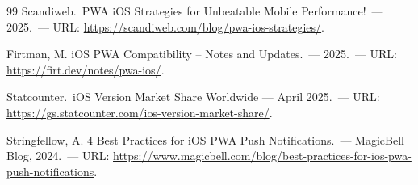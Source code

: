 \begin{thebibliography}{99}
     Scandiweb.\ PWA iOS Strategies for Unbeatable Mobile Performance!\ — 2025.\ — URL: \url{https://scandiweb.com/blog/pwa-ios-strategies/}.

     Firtman, M. iOS PWA Compatibility – Notes and Updates.\ — 2025.\ — URL: \url{https://firt.dev/notes/pwa-ios/}.

     Statcounter.\ iOS Version Market Share Worldwide — April 2025.\ — URL: \url{https://gs.statcounter.com/ios-version-market-share/}.

     Stringfellow, A. 4 Best Practices for iOS PWA Push Notifications.\ — MagicBell Blog, 2024.\ — URL: \url{https://www.magicbell.com/blog/best-practices-for-ios-pwa-push-notifications}.

\end{thebibliography}